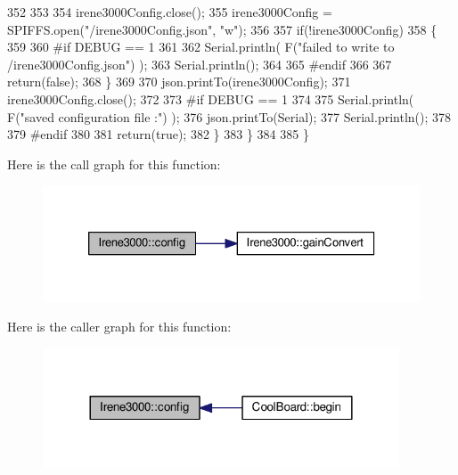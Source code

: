 \begin{DoxyCode}
352 
353 
354             irene3000Config.close();
355             irene3000Config = SPIFFS.open(\textcolor{stringliteral}{"/irene3000Config.json"}, \textcolor{stringliteral}{"w"});
356 
357             \textcolor{keywordflow}{if}(!irene3000Config)
358             \{
359             
360 \textcolor{preprocessor}{            #if DEBUG == 1}
361 
362                 Serial.println( F(\textcolor{stringliteral}{"failed to write to /irene3000Config.json"}) );
363                 Serial.println();
364             
365 \textcolor{preprocessor}{            #endif }
366 
367                 \textcolor{keywordflow}{return}(\textcolor{keyword}{false});
368             \}
369 
370             json.printTo(irene3000Config);
371             irene3000Config.close();
372             
373 \textcolor{preprocessor}{        #if DEBUG == 1 }
374 
375             Serial.println( F(\textcolor{stringliteral}{"saved configuration file :"})  );
376             json.printTo(Serial);
377             Serial.println();
378         
379 \textcolor{preprocessor}{        #endif}
380 
381             \textcolor{keywordflow}{return}(\textcolor{keyword}{true}); 
382         \}
383     \}   
384 
385 \}
\end{DoxyCode}
Here is the call graph for this function\+:\nopagebreak
\begin{figure}[H]
\begin{center}
\leavevmode
\includegraphics[width=326pt]{d6/d03/class_irene3000_afed5c35e4b23963c157847ef27c11e9c_cgraph}
\end{center}
\end{figure}
Here is the caller graph for this function\+:\nopagebreak
\begin{figure}[H]
\begin{center}
\leavevmode
\includegraphics[width=300pt]{d6/d03/class_irene3000_afed5c35e4b23963c157847ef27c11e9c_icgraph}
\end{center}
\end{figure}
\mbox{\label{class_irene3000_abcad62d1201a59f8dd3ba87048002728}} 
